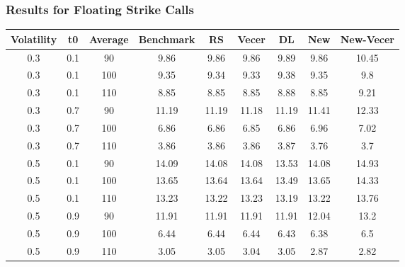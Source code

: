 \documentclass{beamer}
\begin{document}
  \begin{frame}
    \frametitle{Results for Floating Strike Calls}
    \scriptsize
    \begin{table}[h]
      \begin{tabular}{|c|c|c|c|c|c|c|c|c|}
      \hline
      Volatility & t0 & Average & Benchmark & RS & Vecer & DL & New & New-Vecer \\
      \hline
      0.3 & 0.1 & 90 & 9.86 & 9.86 & 9.86 & 9.89 & 9.86 & 10.45 \\
      0.3 & 0.1 & 100 & 9.35 & 9.34 & 9.33 & 9.38 & 9.35 & 9.8 \\
      0.3 & 0.1 & 110 & 8.85 & 8.85 & 8.85 & 8.88 & 8.85 & 9.21 \\
      0.3 & 0.7 & 90 & 11.19 & 11.19 & 11.18 & 11.19 & 11.41 & 12.33 \\
      0.3 & 0.7 & 100 & 6.86 & 6.86 & 6.85 & 6.86 & 6.96 & 7.02 \\
      0.3 & 0.7 & 110 & 3.86 & 3.86 & 3.86 & 3.87 & 3.76 & 3.7 \\
      0.5 & 0.1 & 90 & 14.09 & 14.08 & 14.08 & 13.53 & 14.08 & 14.93 \\
      0.5 & 0.1 & 100 & 13.65 & 13.64 & 13.64 & 13.49 & 13.65 & 14.33 \\
      0.5 & 0.1 & 110 & 13.23 & 13.22 & 13.23 & 13.19 & 13.22 & 13.76 \\
      0.5 & 0.9 & 90 & 11.91 & 11.91 & 11.91 & 11.91 & 12.04 & 13.2 \\
      0.5 & 0.9 & 100 & 6.44 & 6.44 & 6.44 & 6.43 & 6.38 & 6.5 \\
      0.5 & 0.9 & 110 & 3.05 & 3.05 & 3.04 & 3.05 & 2.87 & 2.82 \\
      \hline
      \end{tabular}
    \end{table}
  \end{frame}
\end{document}
